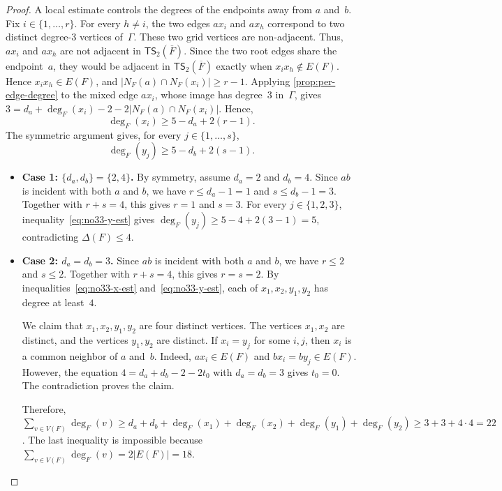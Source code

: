 \documentclass[a4paper]{article}
\theoremstyle{plain}
\theoremstyle{definition}
\newcommand{\TSsym}{\mathsf{TS}}
\numberwithin{equation}{section}
\begin{document}
\begin{proof}
A local estimate controls the degrees of the endpoints away from $a$ and~$b$.
Fix $i\in\{1,\ldots,r\}$.
For every $h\ne i$, the two edges $ax_i$ and $ax_h$ correspond to two distinct degree-$3$ vertices of~$\Gamma$.
These two grid vertices are non-adjacent.
Thus, $ax_i$ and $ax_h$ are not adjacent in $\TSsym_2(\overline{F})$.
Since the two root edges share the endpoint~$a$, they would be adjacent in $\TSsym_2(\overline{F})$ exactly when $x_i x_h\notin E(F)$.
Hence $x_i x_h\in E(F)$, and $|N_F(a)\cap N_F(x_i)|\ge r-1$.
Applying \cref{prop:per-edge-degree} to the mixed edge $ax_i$, whose image has degree~$3$ in~$\Gamma$, gives
$3=d_a+\deg_F(x_i)-2-2|N_F(a)\cap N_F(x_i)|$.
Hence,
\begin{equation}
\deg_F(x_i)\ge 5-d_a+2(r-1).
\label{eq:no33-x-est}
\end{equation}
The symmetric argument gives, for every $j\in\{1,\ldots,s\}$,
\begin{equation}
\deg_F(y_j)\ge 5-d_b+2(s-1).
\label{eq:no33-y-est}
\end{equation}

\begin{itemize}
\item \textbf{Case 1: $\{d_a,d_b\}=\{2,4\}$.}
By symmetry, assume $d_a=2$ and $d_b=4$.
Since $ab$ is incident with both $a$ and $b$, we have $r\le d_a-1=1$ and $s\le d_b-1=3$.
Together with $r+s=4$, this gives $r=1$ and $s=3$.
For every $j\in\{1,2,3\}$, inequality~\eqref{eq:no33-y-est} gives $\deg_F(y_j)\ge 5-4+2(3-1)=5$,
contradicting $\Delta(F)\le 4$.

\item \textbf{Case 2: $d_a=d_b=3$.}
Since $ab$ is incident with both $a$ and $b$, we have $r\le 2$ and $s\le 2$.
Together with $r+s=4$, this gives $r=s=2$.
By inequalities~\eqref{eq:no33-x-est} and~\eqref{eq:no33-y-est}, each of $x_1,x_2,y_1,y_2$ has degree at least~$4$.

We claim that $x_1,x_2,y_1,y_2$ are four distinct vertices.
The vertices $x_1,x_2$ are distinct, and the vertices $y_1,y_2$ are distinct.
If $x_i=y_j$ for some $i,j$, then $x_i$ is a common neighbor of $a$ and~$b$.
Indeed, $ax_i\in E(F)$ and $bx_i=by_j\in E(F)$.
However, the equation $4=d_a+d_b-2-2t_0$ with $d_a=d_b=3$ gives $t_0=0$.
The contradiction proves the claim.

Therefore, $\displaystyle \sum_{v\in V(F)}\deg_F(v)\ge d_a+d_b+\deg_F(x_1)+\deg_F(x_2)+\deg_F(y_1)+\deg_F(y_2)\ge 3+3+4\cdot 4=22$.
The last inequality is impossible because $\displaystyle \sum_{v\in V(F)}\deg_F(v)=2|E(F)|=18$.


\end{itemize}
\end{proof}
\end{document}
